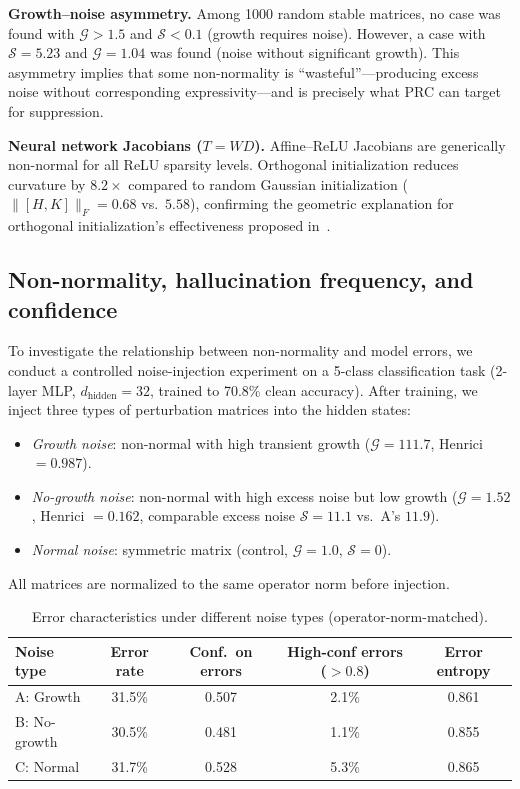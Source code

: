 \documentclass[11pt,a4paper]{article}
\theoremstyle{definition}
\begin{document}
\textbf{Growth--noise asymmetry.}
Among 1000 random stable matrices, no case was found with
$\mathcal{G} > 1.5$ and $\mathcal{S} < 0.1$ (growth requires noise).
However, a case with $\mathcal{S} = 5.23$ and $\mathcal{G} = 1.04$
was found (noise without significant growth). This asymmetry implies
that some non-normality is ``wasteful''---producing excess noise
without corresponding expressivity---and is precisely what PRC can
target for suppression.

\textbf{Neural network Jacobians ($T = WD$).}
Affine--ReLU Jacobians are generically non-normal for all ReLU
sparsity levels. Orthogonal initialization reduces curvature by
$8.2\times$ compared to random Gaussian initialization
($\|[H,K]\|_F = 0.68$ vs.\ $5.58$), confirming the geometric
explanation for orthogonal initialization's effectiveness
proposed in~\cite{cheng2025nnog}.

\subsection{Non-normality, hallucination frequency, and confidence}
\label{sec:hallucination}

To investigate the relationship between non-normality and model errors,
we conduct a controlled noise-injection experiment on a 5-class
classification task (2-layer MLP, $d_{\mathrm{hidden}} = 32$,
trained to 70.8\% clean accuracy). After training, we inject
three types of perturbation matrices into the hidden states:
\begin{itemize}[nosep]
  \item[\textbf{A}:] \emph{Growth noise}: non-normal with high transient
        growth ($\mathcal{G} = 111.7$, Henrici $= 0.987$).
  \item[\textbf{B}:] \emph{No-growth noise}: non-normal with high excess
        noise but low growth ($\mathcal{G} = 1.52$, Henrici $= 0.162$,
        comparable excess noise $\mathcal{S} = 11.1$ vs.\ A's $11.9$).
  \item[\textbf{C}:] \emph{Normal noise}: symmetric matrix (control,
        $\mathcal{G} = 1.0$, $\mathcal{S} = 0$).
\end{itemize}
All matrices are normalized to the same operator norm before injection.

\begin{table}[ht]
\centering
\caption{Error characteristics under different noise types (operator-norm-matched).}
\label{tab:hallucination}
\begin{tabular}{@{}lcccc@{}}
\toprule
Noise type & Error rate & Conf.\ on errors & High-conf errors ($>0.8$) & Error entropy \\
\midrule
A: Growth       & 31.5\% & 0.507 & 2.1\% & 0.861 \\
B: No-growth    & 30.5\% & 0.481 & 1.1\% & 0.855 \\
C: Normal       & 31.7\% & 0.528 & 5.3\% & 0.865 \\
\bottomrule
\end{tabular}
\end{table}
\end{document}
